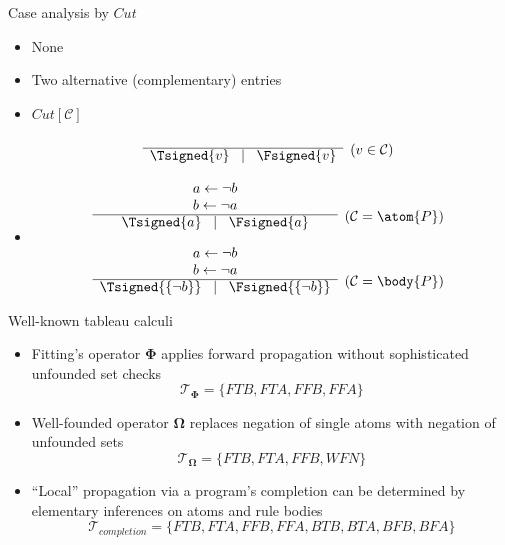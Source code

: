 \begin{frame}{Case analysis by $\textit{Cut}$}
\begin{itemize}
\item {} None
\item {} Two alternative (complementary) entries
\item {} \textnormal{$\textit{Cut}[\mathcal{C}]$}~\\[-5mm]
\[
\begin{array}{cl}
&
\raisebox{-8pt}[0pt][0pt]{($v \in {\mathcal{C}}$)}
\\\cline{1-1}
\Tsigned{v} \;\; \mid \;\; \Fsigned{v}
\end{array}
\]
\item<2-> 
\[
\begin{array}{cl}
a \leftarrow \neg b \\
b \leftarrow \neg a &
\raisebox{-8pt}[0pt][0pt]{(${\mathcal{C}} = \atom{P}$)}
\\\cline{1-1}
\Tsigned{a} \;\; \mid \;\; \Fsigned{a}
\\[10pt]
a \leftarrow \neg b \\
b \leftarrow \neg a &
\raisebox{-8pt}[0pt][0pt]{(${\mathcal{C}} = \body{P}$)}
\\\cline{1-1}
\Tsigned{\{\neg b\}} \;\; \mid \;\; \Fsigned{\{\neg b\}}
\end{array}
\]
\end{itemize}
\end{frame}
\begin{frame}{Well-known tableau calculi}
  \begin{itemize}
  \item <1-> Fitting's operator $\mathbf{\Phi}$ applies forward propagation without sophisticated
    unfounded set checks
    \[
    {\mathcal{T}}_{\mathbf{\Phi}} = \{\textit{FTB},\textit{FTA},\textit{FFB},\textit{FFA}\}
    \]
  \item <2-> Well-founded operator $\mathbf{\Omega}$ replaces negation of single atoms with negation
    of unfounded sets
    \[
    {\mathcal{T}}_{\mathbf{\Omega}} = \{\textit{FTB},\textit{FTA},\textit{FFB},\textit{WFN}\}
    \]
  \item <3-> ``Local'' propagation via a program's completion can be determined by elementary
    inferences on atoms and rule bodies
    \[
    {\mathcal{T}}_{\textit{completion}} =
    \{\textit{FTB},\textit{FTA},\textit{FFB},\textit{FFA},\textit{BTB},\textit{BTA},\textit{BFB},\textit{BFA}\}
    \]
  \end{itemize}
\end{frame}
%
